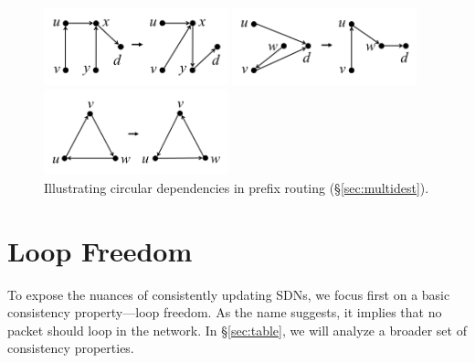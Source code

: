 
\begin{figure}
\begin{minipage}[b]{2.1in}
\centering
\includegraphics[width=2.1in]{figures/noloops.png}
\caption{Illustrating loop freedom (\S\ref{sec:loop-free}).}
\label{fig:example}
\end{minipage}
\hfill
\begin{minipage}[b]{2.1in}
\centering
\includegraphics[width=2.1in]{figures/nominimum.png}
\caption{Illustrating multiple minimal solutions (\S\ref{sec:minimal}).}
\label{fig:minimal}
\end{minipage}
\hfill
\begin{minipage}[b]{2.1in}
\centering
\includegraphics[width=2.1in]{figures/multidest.png}
\caption{Illustrating circular dependencies in prefix routing (\S\ref{sec:multidest}).}
\label{fig:multidest}
\end{minipage}
\end{figure}



\section{Loop Freedom}
\label{sec:loop-free}

To expose the nuances of consistently updating SDNs, we focus first on a basic consistency property---loop freedom. As the name suggests, it implies that no packet should loop in the network.  In \S\ref{sec:table}, we will analyze a broader set of consistency properties.

